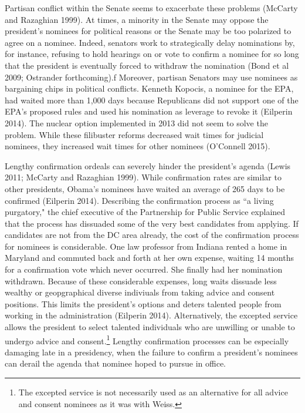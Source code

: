\documentclass[12pt]{article}
\begin{document}
Partisan conflict within the Senate seems to exacerbate these problems (McCarty and Razaghian 1999). At times, a minority in the Senate may oppose the president's nominees for political reasons or the Senate may be too polarized to agree on a nominee. Indeed, senators work to strategically delay nominations by, for instance, refusing to hold hearings on or vote to confirm a nominee for so long that the president is eventually forced to withdraw the nomination (Bond et al 2009; Ostrander forthcoming).f Moreover, partisan Senators may use nominees as bargaining chips in political conflicts. Kenneth Kopocis, a nominee for the EPA, had waited more than 1,000 days because Republicans did not support one of the EPA's proposed rules and used his nomination as leverage to revoke it (Eilperin 2014). The nuclear option implemented in 2013 did not seem to solve the problem. While these filibuster reforms decreased wait times for judicial nominees, they increased wait times for other nominees (O'Connell 2015). 

Lengthy confirmation ordeals can severely hinder the president's agenda (Lewis 2011; McCarty and Razaghian 1999). While confirmation rates are similar to other presidents, Obama's nominees have waited an average of 265 days to be confirmed (Eilperin 2014). Describing the confirmation process as ``a living purgatory," the chief executive of the Partnership for Public Service explained that the process has dissuaded some of the very best candidates from applying. If candidates are not from the DC area already, the cost of the confirmation process for nominees is considerable. One law professor from Indiana rented a home in Maryland and commuted back and forth at her own expense, waiting 14 months for a confirmation vote which never occurred. She finally had her nomination withdrawn. Because of these considerable expenses, long waits dissuade less wealthy or geopgraphical diverse indiviuals from taking advice and consent positions. This limits the president's options and deters talented people from working in the administration (Eilperin 2014). Alternatively, the excepted service allows the president to select talented individuals who are unwilling or unable to undergo advice and consent.\footnote{The excepted service is not necessarily used as an alternative for all advice and consent nominees as it was with Weiss.} Lengthy confirmation processes can be especially damaging late in a presidency, when the failure to confirm a president's nominees can derail the agenda that nominee hoped to pursue in office.
\end{document}
